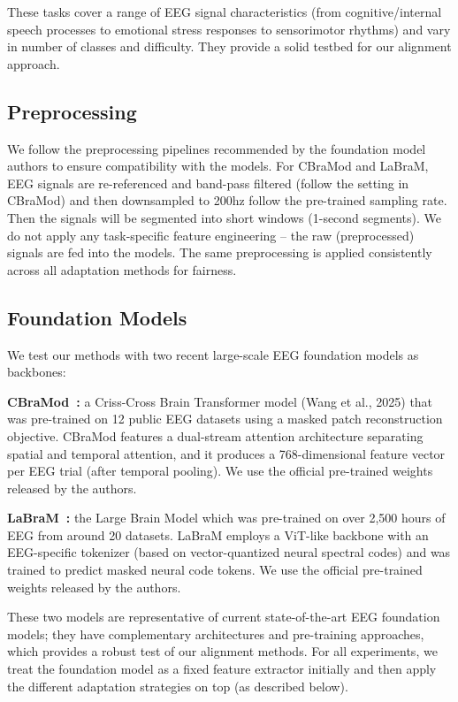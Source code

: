 These tasks cover a range of EEG signal characteristics (from cognitive/internal speech processes to emotional stress responses to sensorimotor rhythms) and vary in number of classes and difficulty. They provide a solid testbed for our alignment approach. 

\subsection{Preprocessing}
\label{sec:Appendix_preprocessing}
We follow the preprocessing pipelines recommended by the foundation model authors to ensure compatibility with the models. For CBraMod and LaBraM, EEG signals are re-referenced and band-pass filtered (follow the setting in CBraMod) and then downsampled to 200hz follow the pre-trained sampling rate. Then the signals will be segmented into short windows (1-second segments). We do not apply any task-specific feature engineering – the raw (preprocessed) signals are fed into the models. The same preprocessing is applied consistently across all adaptation methods for fairness.

\subsection{Foundation Models}
\label{sec:Appendix_models}

We test our methods with two recent large-scale EEG foundation models as backbones:

\textbf{CBraMod~\citep{wang2024cbramod}:} a Criss-Cross Brain Transformer model (Wang et al., 2025) that was pre-trained on 12 public EEG datasets using a masked patch reconstruction objective. CBraMod features a dual-stream attention architecture separating spatial and temporal attention, and it produces a 768-dimensional feature vector per EEG trial (after temporal pooling). We use the official pre-trained weights released by the authors.

\textbf{LaBraM~\citep{jiang2024large}:} the Large Brain Model which was pre-trained on over 2,500 hours of EEG from around 20 datasets. LaBraM employs a ViT-like backbone with an EEG-specific tokenizer (based on vector-quantized neural spectral codes) and was trained to predict masked neural code tokens. We use the official pre-trained weights released by the authors.


These two models are representative of current state-of-the-art EEG foundation models; they have complementary architectures and pre-training approaches, which provides a robust test of our alignment methods. For all experiments, we treat the foundation model as a fixed feature extractor initially and then apply the different adaptation strategies on top (as described below). 

